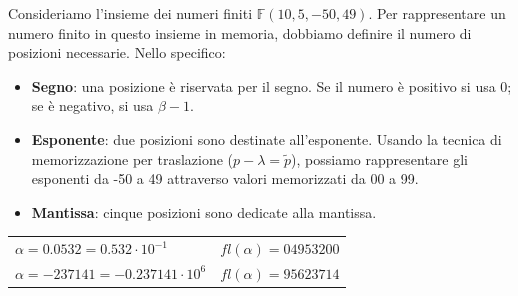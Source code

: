\documentclass{article}
\begin{document}
\newpage
\begin{example}
   Consideriamo l'insieme dei numeri finiti $\mathbb{F}(10,5,-50,49)$. Per
   rappresentare un numero finito in questo insieme in memoria, dobbiamo
   definire il numero di posizioni necessarie. Nello specifico:
   \begin{itemize}
       \item\textbf{Segno}: una posizione è riservata per il segno. Se il numero
           è positivo si usa 0; se è negativo, si usa $\beta-1$.
        \item\textbf{Esponente}: due posizioni sono destinate all'esponente.
            Usando la tecnica di memorizzazione per traslazione
            ($p-\lambda=\tilde{p}$), possiamo
            rappresentare gli esponenti da -50 a 49 attraverso valori
            memorizzati da 00 a 99.
        \item\textbf{Mantissa}: cinque posizioni sono dedicate alla mantissa.
   \end{itemize}
   \begin{center}
        \begin{tabular}{ll}
            $\alpha=0.0532=0.532\cdot10^{-1}$ & $fl(\alpha)=04953200$\\ 
            $\alpha=-237141=-0.237141\cdot10^{6}$ & $fl(\alpha)=95623714$
        \end{tabular}
   \end{center}
\end{example}
\end{document}
